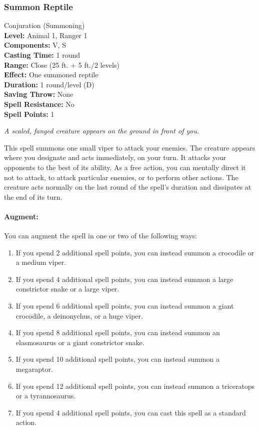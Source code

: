 \subsubsection{Summon Reptile}
\label{Spell:SummonReptile}
Conjuration (Summoning)
\\ \textbf{Level:} Animal 1, Ranger 1
\\ \textbf{Components:} V, S
\\ \textbf{Casting Time:} 1 round
\\ \textbf{Range:} Close (25 ft. + 5 ft./2 levels)
\\ \textbf{Effect:} One summoned reptile
\\ \textbf{Duration:} 1 round/level (D)
\\ \textbf{Saving Throw:} None
\\ \textbf{Spell Resistance:} No
\\ \textbf{Spell Points:} 1

\emph{A scaled, fanged creature appears on the ground in front of you.}

This spell summons one small viper to attack your enemies. 
The creature appears where you designate and acts immediately, on your turn. 
It attacks your opponents to the best of its ability. 
As a free action, you can mentally direct it not to attack, to attack particular enemies, or to perform other actions. 
The creature acts normally on the last round of the spell's duration and dissipates at the end of its turn.

\paragraph{Augment:} You can augment the spell in one or two of the following ways: 
\begin{enumerate}
 \item If you spend 2 additional spell points, you can instead summon a crocodile or a medium viper.
 \item If you spend 4 additional spell points, you can instead summon a large constrictor snake or a large viper.
 \item If you spend 6 additional spell points, you can instead summon a giant crocodile, a deinonychus, or a huge viper.
 \item If you spend 8 additional spell points, you can instead summon an elasmosaurus or a giant constrictor snake.
 \item If you spend 10 additional spell points, you can instead summon a megaraptor.
 \item If you spend 12 additional spell points, you can instead summon a triceratops or a tyrannosaurus.
 \item If you spend 4 additional spell points, you can cast this spell as a standard action.
\end{enumerate}
